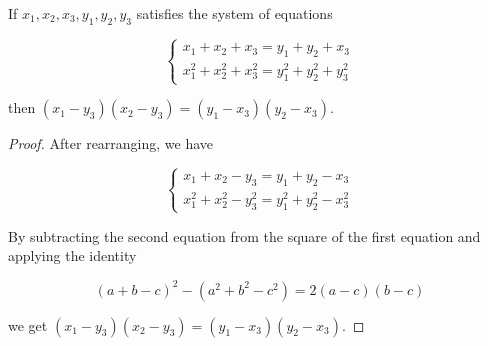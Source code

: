 \begin{lem}\label{lem:quadratic system}
If $x_{1}, x_{2}, x_{3}, y_{1}, y_{2}, y_{3}$ satisfies the system of equations    



\begin{equation}\label{eq:sysmte}
\left\{\begin{array}{l}
x_{1}+x_{2}+x_{3}=y_{1}+y_{2}+x_{3}  \\
x_{1}^{2}+x_{2}^{2}+x_{3}^{2}=y_{1}^{2}+y_{2}^{2}+y_{3}^{2}
\end{array}\right.
\end{equation}

then $\left(x_{1}-y_{3}\right)\left(x_{2}-y_{3}\right)=\left(y_{1}-x_{3}\right)\left(y_{2}-x_{3}\right)$.
\end{lem}
\begin{proof}
 After rearranging, we have

$$
\left\{\begin{array}{l}
x_{1}+x_{2}-y_{3}=y_{1}+y_{2}-x_{3} \\
x_{1}^{2}+x_{2}^{2}-y_{3}^{2}=y_{1}^{2}+y_{2}^{2}-x_{3}^{2}
\end{array}\right.
$$

By subtracting the second equation from the square of the first equation and applying the identity

$$
(a+b-c)^{2}-\left(a^{2}+b^{2}-c^{2}\right)=2(a-c)(b-c)
$$

we get $\left(x_{1}-y_{3}\right)\left(x_{2}-y_{3}\right)=\left(y_{1}-x_{3}\right)\left(y_{2}-x_{3}\right)$.
\end{proof}

